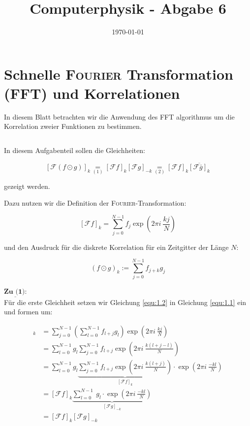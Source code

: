 \documentclass[ngerman]{scrartcl}
\title{Computerphysik - Abgabe 6}
\date{\today}
\begin{document}
	\setcounter{section}{9}
	\thispagestyle{fancy}
	\renewcommand{\thesection}{H.\arabic{section}:}
	\renewcommand{\thesubsection}{H\arabic{section}.\arabic{subsection}}
	
\section{Schnelle \textsc{Fourier} Transformation (FFT) und Korrelationen}
In diesem Blatt betrachten wir die Anwendung des FFT algorithmus
um die Korrelation zweier Funktionen zu bestimmen.

\subsection{}

In diesem Aufgabenteil sollen die Gleichheiten:

\begin{equation}
\label{equ:1.3}
	[\mathcal{F}(f \odot g)]_{k} \underset{(1)}{=} [\mathcal{F} f]_{k}[\mathcal{F} g]_{-k} \underset{(2)}{=} [\mathcal{F} f]_{k} \overline{[\mathcal{F} \bar{g}]_{k}}
\end{equation}

gezeigt werden.

Dazu nutzen wir die Definition der \textsc{Fourier}-Transformation:

\begin{equation}
\label{equ:1.1}
	[\mathcal{F} f]_{k}=\sum_{j=0}^{N-1} f_{j} \exp (2 \pi i ~\frac{kj}{N})
\end{equation}

und den Ausdruck für die diskrete Korrelation für ein Zeitgitter der Länge $N$:

\begin{equation}
\label{equ:1.2}
	(f \odot g)_{k}:=\sum_{j=0}^{N-1} f_{j+k} g_{j}
\end{equation}

$\underline{\textbf{Zu (1):}}$\\
Für die erste Gleichheit setzen wir Gleichung \ref{equ:1.2} in Gleichung \ref{equ:1.1} ein und formen um:

\begin{align*}
	[\mathcal{F}(f \odot g)]_{k}
	&= \sum_{j=0}^{N-1} \left( \sum_{l=0}^{N-1} f_{l+j} g_{l} \right)  \exp (2 \pi i ~\frac{kj}{N})\\
	&= \sum_{l=0}^{N-1} g_l \sum_{j=0}^{N-1} f_{l+j} \exp (2 \pi i ~\frac{k(l+j-l)}{N})\\
	&= \sum_{l=0}^{N-1} g_l \underbrace{\sum_{j=0}^{N-1} f_{l+j} \exp (2 \pi i ~\frac{k(l+j)}{N})}_{[\mathcal{F} f]_{k}} \cdot \exp (2 \pi i ~\frac{-kl}{N})\\
	&= [\mathcal{F} f]_{k} \underbrace{\sum_{l=0}^{N-1} ~ g_l \cdot \exp (2 \pi i ~\frac{-kl}{N})}_{[\mathcal{F} g]_{-k}}\\
	&= [\mathcal{F} f]_{k} [\mathcal{F} g]_{-k}\\
\end{align*}
\end{document}
